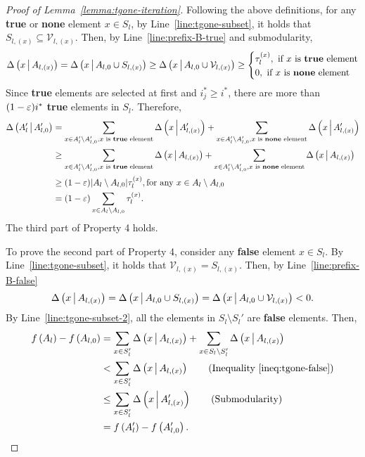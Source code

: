 \begin{proof}[Proof of Lemma~\ref{lemma:tgone-iteration}]
Following the above definitions, for any \textbf{true} or \textbf{none} element $x\in S_l$,
by Line~\ref{line:tgone-subset}, it holds that $S_{l, (x)} \subseteq \mathcal V_{l, (x)}$.
Then, by Line~\ref{line:prefix-B-true} and submodularity,
\begin{equation*}
\Delta \left( x \, \middle| \, A_{l, (x)} \right) = \Delta \left( x \, \middle| \, A_{l, 0} \cup S_{l, (x)} \right)
\ge \Delta \left( x \, \middle| \, A_{l, 0} \cup \mathcal V_{l, (x)} \right) \ge \left\{
\begin{aligned}
&\tau_l^{(x)}, \text{ if } x \text{ is \textbf{true} element}\\
&0, \text{ if } x \text{ is \textbf{none} element}
\end{aligned}\right.
\end{equation*}
Since \textbf{true} elements are selected at first and $i_j^*\ge i^*$,
there are more than $(1-\varepsilon)i^*$ \textbf{true} elements in $S_l$.
Therefore,
\begin{align*}
\Delta \left( A_l' \, \middle| \, A_{l, 0}' \right) &= \sum_{x\in A_l'\setminus A_{l, 0}', x\text{ is \textbf{true} element}} \Delta \left( x \, \middle| \, A_{l, (x)}' \right)
+\sum_{x\in A_l'\setminus A_{l, 0}', x\text{ is \textbf{none} element}} \Delta \left( x \, \middle| \, A_{l, (x)}' \right)\\
&\ge \sum_{x\in A_l'\setminus A_{l, 0}', x\text{ is \textbf{true} element}} \Delta \left( x \, \middle| \, A_{l, (x)} \right)
+\sum_{x\in A_l'\setminus A_{l, 0}', x\text{ is \textbf{none} element}} \Delta \left( x \, \middle| \, A_{l, (x)} \right)\\
&\ge (1-\varepsilon) |A_l\setminus A_{l, 0}| \tau_l^{(x)}, \text{for any } x\in A_l\setminus A_{l, 0}\\
&= (1-\varepsilon)\sum_{x\in A_l\setminus A_{l, 0}} \tau_l^{(x)}.
\end{align*}
The third part of Property 4 holds.

To prove the second part of Property 4, consider any \textbf{false} element $x\in S_l$.
By Line~\ref{line:tgone-subset}, it holds that $\mathcal V_{l, (x)} = S_{l, (x)}$.
Then, by Line~\ref{line:prefix-B-false}
\begin{equation}\label{ineq:tgone-false}
\Delta \left( x \, \middle| \, A_{l, (x)} \right) = \Delta \left( x \, \middle| \, A_{l, 0} \cup S_{l, (x)} \right)
= \Delta \left( x \, \middle| \, A_{l, 0} \cup \mathcal V_{l, (x)} \right) < 0.
\end{equation}
By Line~\ref{line:tgone-subset-2}, all the elements in $S_l\setminus S_l'$ are
\textbf{false} elements.
Then,
\begin{align*}
\ff{A_l} - \ff{A_{l, 0}} &= \sum_{x\in S_l'}\marge{x}{A_{l, (x)}} + \sum_{x\in S_l\setminus S_l'}\marge{x}{A_{l, (x)}}\\
&< \sum_{x\in S_l'}\marge{x}{A_{l, (x)}} \tag{Inequality~\ref{ineq:tgone-false}}\\
&\le \sum_{x\in S_l'}\marge{x}{A_{l, (x)}'} \tag{Submodularity}\\
& = \ff{A_l'} - \ff{A_{l, 0}'}.
\end{align*}
\end{proof}

